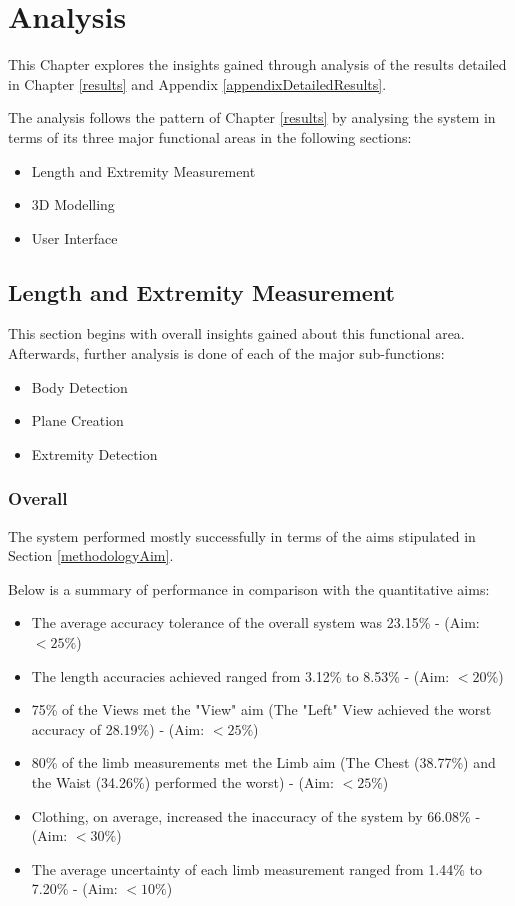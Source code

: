 \chapter{Analysis} \label{analysis}

This Chapter explores the insights gained through analysis of the results detailed in Chapter \ref{results} and Appendix \ref{appendixDetailedResults}.

The analysis follows the pattern of Chapter \ref{results} by analysing the system in terms of its three major functional areas in the following sections:

\begin{itemize}
	\item Length and Extremity Measurement
	\item 3D Modelling
	\item User Interface
\end{itemize} 

\section{Length and Extremity Measurement}
This section begins with overall insights gained about this functional area. Afterwards, further analysis is done of each of the major sub-functions:

\begin{itemize}
	\item Body Detection
	\item Plane Creation
	\item Extremity Detection
\end{itemize}

\subsection{Overall}
The system performed mostly successfully in terms of the aims stipulated in Section \ref{methodologyAim}. 

Below is a summary of performance in comparison with the quantitative aims:

\begin{itemize}
	\item The average accuracy tolerance of the overall system was 23.15\% - (Aim: $<25\%$)
	\item The length accuracies achieved ranged from 3.12\% to 8.53\% - (Aim: $<20\%$)
	\item 75\% of the Views met the "View" aim (The "Left" View achieved the worst accuracy of 28.19\%) - (Aim: $<25\%$)
	\item 80\% of the limb measurements met the Limb aim (The Chest (38.77\%) and the Waist (34.26\%) performed the worst) - (Aim: $<25\%$)
	\item Clothing, on average, increased the inaccuracy of the system by 66.08\% - (Aim: $<30\%$)
	\item The average uncertainty of each limb measurement ranged from 1.44\% to 7.20\% - (Aim: $<10\%$)
\end{itemize}

